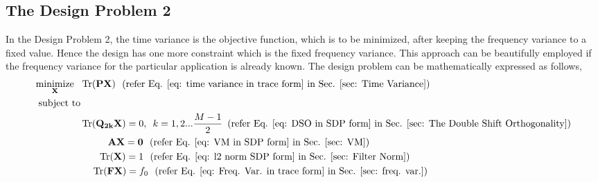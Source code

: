 \subsection{The Design Problem 2}
\label{sub: The Design Problem 2}
In the Design Problem 2, the time variance is the objective function, which is to be minimized, after keeping the frequency variance to a fixed value. Hence the design has one more constraint which is the fixed frequency variance. This approach can be beautifully employed if the frequency variance for the particular application is already known. The design problem can be mathematically expressed as follows,
\begin{eqnarray}
\begin{aligned}
\underset{\mathbf{X}} {\text{minimize}}\,\,\,\, & \operatorname{Tr}(\mathbf{PX})\,\,\,\,  (\text{refer Eq. \ref{eq: time variance in trace form} in Sec. \ref{sec: Time Variance}})
\\ \text{subject to} &\\
& \operatorname{Tr}(\mathbf{Q_{2k}X}) = {0}, \,\,\, k=1,2...\frac{M-1}{2} \,\,\,(\text{refer Eq. \ref{eq: DSO in SDP form} in Sec. \ref{sec: The Double Shift Orthogonality}})
\\&\,\,\,\,\,\,\,\,\,\,\,\,\,\,\,\,\, \mathbf{AX} = \mathbf{0} \,\,\,\, (\text{refer Eq. \ref{eq: VM in SDP form} in Sec. \ref{sec: VM}}) 
\\&\,\,\,\,\,\,\,\,\,\,\, \operatorname{Tr}(\mathbf{X}) = {1} \,\,\,\, (\text{refer Eq. \ref{eq: l2 norm SDP form} in Sec. \ref{sec: Filter Norm}})
\\ &\,\,\,\,\,\,\, \operatorname{Tr}(\mathbf{FX}) = f_0 \,\,\,\, (\text{refer Eq. \ref{eq: Freq. Var. in trace form} in Sec. \ref{sec: freq. var.}})
\end{aligned}
\end{eqnarray}

